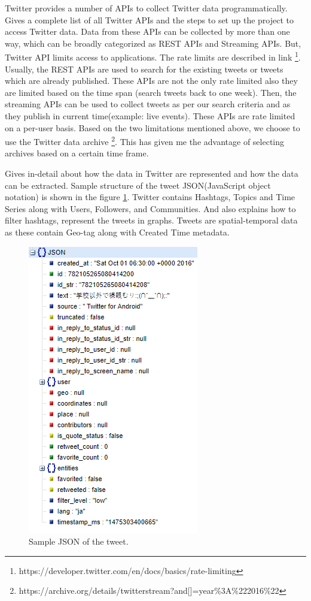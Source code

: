 Twitter provides a number of APIs to collect Twitter data programmatically. \cite{TwitterDevDocs} Gives a complete list of all Twitter APIs and the steps to set up the project to access Twitter data. Data from these APIs can be collected by more than one way, which can be broadly categorized as REST APIs and Streaming APIs. But, Twitter API limits access to applications. The rate limits are described in link  \footnote{https://developer.twitter.com/en/docs/basics/rate-limiting}. Usually, the REST APIs are used to search for the existing tweets or tweets which are already published. These APIs are not the only rate limited also they are limited based on the time span (search tweets back to one week). Then, the streaming APIs can be used to collect tweets as per our search criteria and as they publish in current time(example: live events). These APIs are rate limited on a per-user basis. Based on the two limitations mentioned above, we choose to use the Twitter data archive \footnote{https://archive.org/details/twitterstream?and[]=year\%3A\%222016\%22}. This has given me the advantage of selecting archives based on a certain time frame.



\cite{Marco} Gives in-detail about how the data in Twitter are represented
and how the data can be extracted. Sample structure of the tweet JSON(JavaScript object notation) is shown in the figure \ref{fig:Tweet_json}. Twitter contains Hashtags, Topics and Time Series along with
Users, Followers, and Communities. And  \cite{Marco} also explains how to filter hashtags, represent the
tweets in graphs. Tweets are spatial-temporal data as these contain Geo-tag along with Created
Time metadata.

\begin{figure}
    \centering
    \includegraphics[width=0.5\linewidth]{thesis_template/images/tweet_json.png}
    \caption{Sample JSON of the tweet.}
    \label{fig:Tweet_json}
    
\end{figure}


